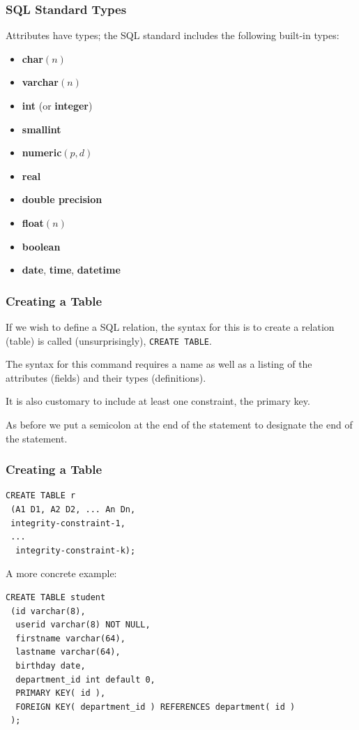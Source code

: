 \begin{frame}
\frametitle{SQL Standard Types}

Attributes have types; the SQL standard includes the following built-in types:

\begin{itemize}
\item \textbf{char}$(n)$
\item \textbf{varchar}$(n)$
\item \textbf{int} (or \textbf{integer})
\item \textbf{smallint}
\item \textbf{numeric}$(p, d)$
\item \textbf{real}
\item \textbf{double precision}
\item \textbf{float}$(n)$
\item \textbf{boolean}
\item \textbf{date}, \textbf{time}, \textbf{datetime}
\end{itemize}

\end{frame}

\begin{frame}
\frametitle{Creating a Table}

If we wish to define a SQL relation, the syntax for this is to create a relation (table) is called (unsurprisingly), \texttt{CREATE TABLE}. 

The syntax for this command requires a name as well as a listing of the attributes (fields) and their types (definitions). 

It is also customary to include at least one constraint, the primary key. 

As before we put a semicolon at the end of the statement to designate the end of the statement. 

\end{frame}

\begin{frame}[fragile]
\frametitle{Creating a Table}


{\small
\begin{verbatim}
CREATE TABLE r
 (A1 D1, A2 D2, ... An Dn,
 integrity-constraint-1,
 ...
  integrity-constraint-k);
\end{verbatim}
}

A more concrete example: 
{\small
\begin{verbatim}
CREATE TABLE student
 (id varchar(8),
  userid varchar(8) NOT NULL,
  firstname varchar(64),
  lastname varchar(64),
  birthday date,
  department_id int default 0,
  PRIMARY KEY( id ),
  FOREIGN KEY( department_id ) REFERENCES department( id )
 );
\end{verbatim}
}

\end{frame}


